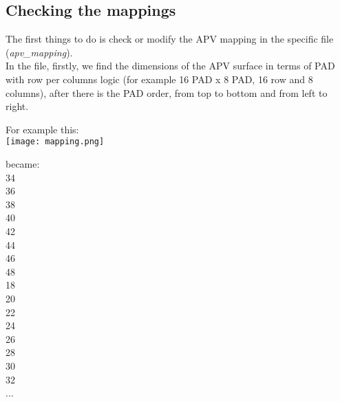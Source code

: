 \documentclass[a4paper,12pt]{article}
\begin{document}
		\subsection{Checking the mappings}
			The first things to do is check or modify the APV mapping in the specific file (\textit{apv\_mapping}).\\ 
			In the file, firstly, we find the dimensions of the APV surface in terms of PAD with row per columns logic (for example 16 PAD x 8 PAD, 16 row and 8 columns), after there is the PAD order, from top to bottom and from left to right.\\
			\begin{minipage}[c]{0.49\textwidth}
				For example this:\\
				\centering
				\texttt{[image: mapping.png]}
			\end{minipage}
			\begin{minipage}[c]{0.49\textwidth}
				\centering
				became:\\
				34\\
				36\\
				38\\
				40\\
				42\\
				44\\
				46\\
				48\\
				18\\
				20\\
				22\\
				24\\
				26\\
				28\\
				30\\
				32\\
				...\\
			\end{minipage}
		
\end{document}

